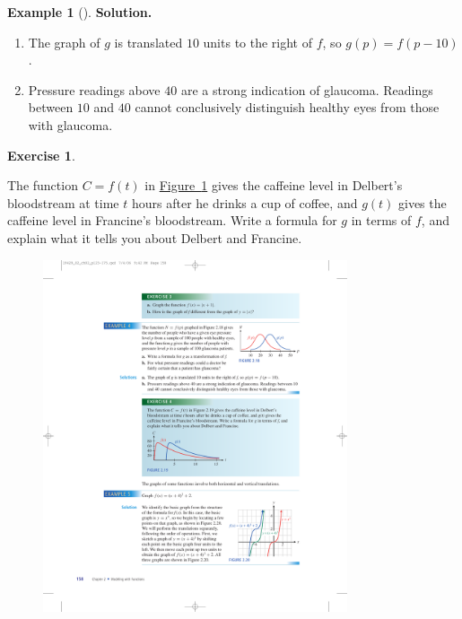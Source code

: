 \documentclass[10pt,]{book}
\theoremstyle{plain}
\theoremstyle{definition}
\theoremstyle{definition}
\theoremstyle{definition}
\newtheorem{example}[theorem]{Example}
\theoremstyle{definition}
\theoremstyle{definition}
\newtheorem{exercise}[theorem]{Exercise}
\numberwithin{equation}{section}
\begin{document}
\begin{example}[]
\par\medskip\noindent%
\textbf{Solution.}\quad \leavevmode%
\begin{enumerate}[label=*\alph**]
\item\hypertarget{li-304}{}The graph of \(g\) is translated \(10\) units to the right of \(f\), so \(g(p) = f (p − 10)\).\item\hypertarget{li-305}{}Pressure readings above \(40\) are a strong indication of glaucoma. Readings between \(10\) and \(40\) cannot conclusively distinguish healthy eyes from those with glaucoma.\end{enumerate}
\end{example}
\begin{exercise}\label{exercise-shift-surge-curve}

    The function \(C = f (t)\) in \hyperref[fig-shift-surge-curve]{Figure~\ref{fig-shift-surge-curve}} gives the caffeine level in Delbert's bloodstream at time \(t\) hours after he drinks a cup of coffee, and \(g(t)\) gives the caffeine level in Francine's bloodstream. Write a formula for \(g\) in terms of \(f\), and explain what it tells you about Delbert and Francine.
    \leavevmode%
\begin{figure}
\centering
\includegraphics[width=0.80\textwidth,]{images/fig-shift-surge-curve.pdf}\caption{\label{fig-shift-surge-curve}}
\end{figure}
\end{exercise}
\end{document}
